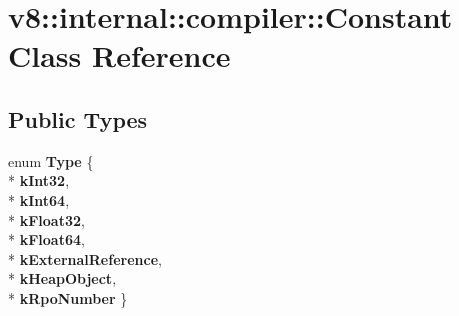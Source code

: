 \hypertarget{classv8_1_1internal_1_1compiler_1_1_constant}{}\section{v8\+:\+:internal\+:\+:compiler\+:\+:Constant Class Reference}
\label{classv8_1_1internal_1_1compiler_1_1_constant}
\subsection*{Public Types}
\begin{DoxyCompactItemize}
\item 
enum {\bfseries Type} \{ \\*
{\bfseries k\+Int32}, 
\\*
{\bfseries k\+Int64}, 
\\*
{\bfseries k\+Float32}, 
\\*
{\bfseries k\+Float64}, 
\\*
{\bfseries k\+External\+Reference}, 
\\*
{\bfseries k\+Heap\+Object}, 
\\*
{\bfseries k\+Rpo\+Number}
 \}\hypertarget{classv8_1_1internal_1_1compiler_1_1_constant_a77b19008bb8c006158bcca90c4b45fb5}{}\label{classv8_1_1internal_1_1compiler_1_1_constant_a77b19008bb8c006158bcca90c4b45fb5}

\end{DoxyCompactItemize}
